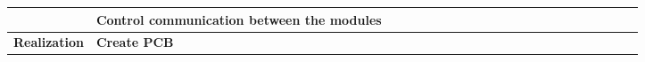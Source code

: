 \begin{table}[ht!]
\begin{tabular}{lp{2.5in}|llllllllllllllllllll|}
    \multicolumn{1}{|l|}{\cellcolor[HTML]{00E2FF}\textbf{}}                & \cellcolor[HTML]{00E2FF}\textbf{Control communication between the modules} & \multicolumn{1}{l|}{}                                   & \multicolumn{1}{l|}{}                                   & \multicolumn{1}{l|}{}                                   & \multicolumn{1}{l|}{}                                   & \multicolumn{1}{l|}{}                                   & \multicolumn{1}{l|}{}                                   & \multicolumn{1}{l|}{}                                   & \multicolumn{1}{l|}{\cellcolor[HTML]{F8A102}}           & \multicolumn{1}{l|}{\cellcolor[HTML]{F8A102}}           & \multicolumn{1}{l|}{\cellcolor[HTML]{F8A102}}            & \multicolumn{1}{l|}{}                                    & \multicolumn{1}{l|}{}                                    & \multicolumn{1}{l|}{}                                    & \multicolumn{1}{l|}{}                                    & \multicolumn{1}{l|}{}                                    & \multicolumn{1}{l|}{}                                    & \multicolumn{1}{l|}{}                                    & \multicolumn{1}{l|}{}                                    & \multicolumn{1}{l|}{}                                    &             \\ \hline
    \multicolumn{1}{|l|}{\cellcolor[HTML]{00E2FF}\textbf{Realization}}     & \cellcolor[HTML]{00E2FF}\textbf{Create PCB}                                & \multicolumn{1}{l|}{}                                   & \multicolumn{1}{l|}{}                                   & \multicolumn{1}{l|}{}                                   & \multicolumn{1}{l|}{}                                   & \multicolumn{1}{l|}{}                                   & \multicolumn{1}{l|}{}                                   & \multicolumn{1}{l|}{\cellcolor[HTML]{F8A102}}           & \multicolumn{1}{l|}{}                                   & \multicolumn{1}{l|}{}                                   & \multicolumn{1}{l|}{\cellcolor[HTML]{F8A102}}            & \multicolumn{1}{l|}{}                                    & \multicolumn{1}{l|}{}                                    & \multicolumn{1}{l|}{\cellcolor[HTML]{F8A102}}            & \multicolumn{1}{l|}{}                                    & \multicolumn{1}{l|}{}                                    & \multicolumn{1}{l|}{\cellcolor[HTML]{F8A102}}            & \multicolumn{1}{l|}{}                                    & \multicolumn{1}{l|}{}                                    & \multicolumn{1}{l|}{}                                    &             \\ \hline

\end{tabular}
\end{table}

